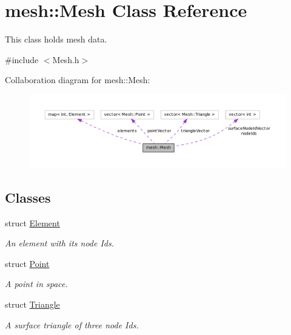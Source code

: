\hypertarget{classmesh_1_1_mesh}{
\section{mesh::Mesh Class Reference}
\label{classmesh_1_1_mesh}
}


This class holds mesh data.  




{\ttfamily \#include $<$Mesh.h$>$}



Collaboration diagram for mesh::Mesh:\nopagebreak
\begin{figure}[H]
\begin{center}
\leavevmode
\includegraphics[width=400pt]{classmesh_1_1_mesh__coll__graph}
\end{center}
\end{figure}
\subsection*{Classes}
\begin{DoxyCompactItemize}
\item 
struct \hyperlink{structmesh_1_1_mesh_1_1_element}{Element}
\begin{DoxyCompactList}\small\item\em An element with its node Ids. \item\end{DoxyCompactList}\item 
struct \hyperlink{structmesh_1_1_mesh_1_1_point}{Point}
\begin{DoxyCompactList}\small\item\em A point in space. \item\end{DoxyCompactList}\item 
struct \hyperlink{structmesh_1_1_mesh_1_1_triangle}{Triangle}
\begin{DoxyCompactList}\small\item\em A surface triangle of three node Ids. \item\end{DoxyCompactList}\end{DoxyCompactItemize}
